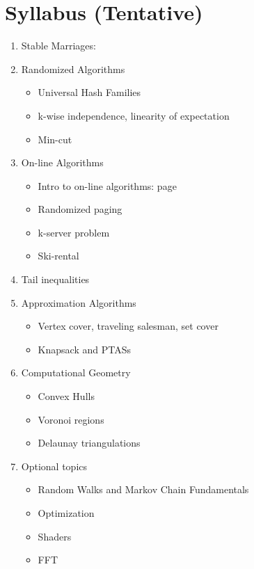 \documentclass{article}
\begin{document}
\section*{Syllabus (Tentative)}
    \begin{enumerate}[label=\Roman*.]
        \item Stable Marriages:
        \item Randomized Algorithms
        \begin{itemize}
            \item Universal Hash Families
            \item k-wise independence, linearity of expectation
            \item Min-cut
        \end{itemize}
        \item On-line Algorithms
        \begin{itemize}
            \item Intro to on-line algorithms: page
            \item Randomized paging
            \item k-server problem
            \item Ski-rental
        \end{itemize}
        \item Tail inequalities
        \item Approximation Algorithms
        \begin{itemize}
            \item Vertex cover, traveling salesman, set cover
            \item Knapsack and PTASs
        \end{itemize}
        \item Computational Geometry
        \begin{itemize}
            \item Convex Hulls
            \item Voronoi regions
            \item Delaunay triangulations
        \end{itemize}
        \item Optional topics
        \begin{itemize}
            \item Random Walks and Markov Chain Fundamentals
            \item Optimization
            \item Shaders
            \item FFT
        \end{itemize}
    \end{enumerate}
\end{document}
